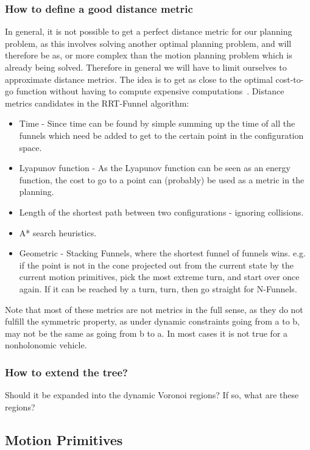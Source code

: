 \subsubsection{How to define a good distance metric}
In general, it is not possible to get a perfect distance metric for our planning
problem, as this involves solving another optimal planning problem, and will
therefore be as, or more complex than the motion planning problem which is
already being solved. Therefore in general we will have to limit ourselves to
approximate distance metrics. The idea is to get as close to the optimal
cost-to-go function without having to compute expensive computations~\cite{Lav06}.
Distance metrics candidates in the RRT-Funnel algorithm:
\begin{itemize}
  \item Time - Since time can be found by simple summing up the time of all the
    funnels which need be added to get to the certain point in the configuration space.
  \item Lyapunov function - As the Lyapunov function can be seen as an energy
    function, the cost to go to a point can (probably) be used as a metric in
    the planning.
  \item Length of the shortest path between two configurations - ignoring collisions.
  \item A* search heuristics.
  \item Geometric - Stacking Funnels, where the shortest funnel of funnels wins.
    e.g. if the point is not in the cone projected out from the current state by
    the current motion primitives, pick the most extreme turn, and start over
    once again. If it can be reached by a turn, turn, then go straight for N-Funnels.
\end{itemize}

Note that most of these metrics are not metrics in the full sense, as they do
not fulfill the symmetric property, as under dynamic constraints going from a to
b, may not be the same as going from b to a. In most cases it is not true for a
nonholonomic vehicle.

\subsubsection{How to extend the tree?}

Should it be expanded into the dynamic Voronoi regions? If so, what are these regions?


\subsection{Motion Primitives}

